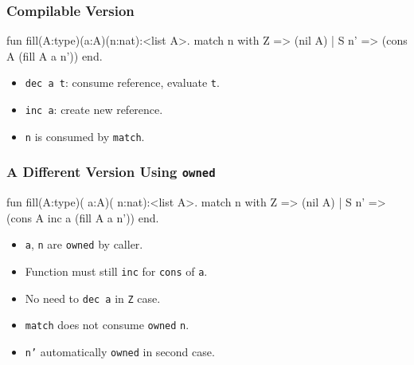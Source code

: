 \documentclass[11pt]{beamer}
\begin{document}
\begin{frame}[containsverbatim]
\frametitle{Compilable Version}
\begin{code}
fun fill(A:type)(a:A)(n:nat):<list A>.
  match n with
    Z =>  (nil A)
  | S n' => (cons A  (fill A a n'))
  end.
\end{code}

\begin{itemize}
\item \texttt{dec a t}: consume reference, evaluate \texttt{t}.
\item \texttt{inc a}: create new reference.
\item \texttt{n} is consumed by \texttt{match}.
\end{itemize}
\end{frame}

\begin{frame}[containsverbatim]
\frametitle{A Different Version Using \texttt{owned}}
\begin{code}
fun fill(A:type)( a:A)( n:nat):<list A>.
  match n with
    Z => (nil A)
  | S n' => (cons A inc a (fill A a n'))
  end.
\end{code}

\begin{itemize}
\item \texttt{a}, \texttt{n} are \texttt{owned} by caller.
\item Function must still \texttt{inc} for \texttt{cons} of \texttt{a}.
\item No need to \texttt{dec a} in \texttt{Z} case.
\item \texttt{match} does not consume \texttt{owned} \texttt{n}.
\item \texttt{n'} automatically \texttt{owned} in second case.
\end{itemize}
\end{frame}
\end{document}
